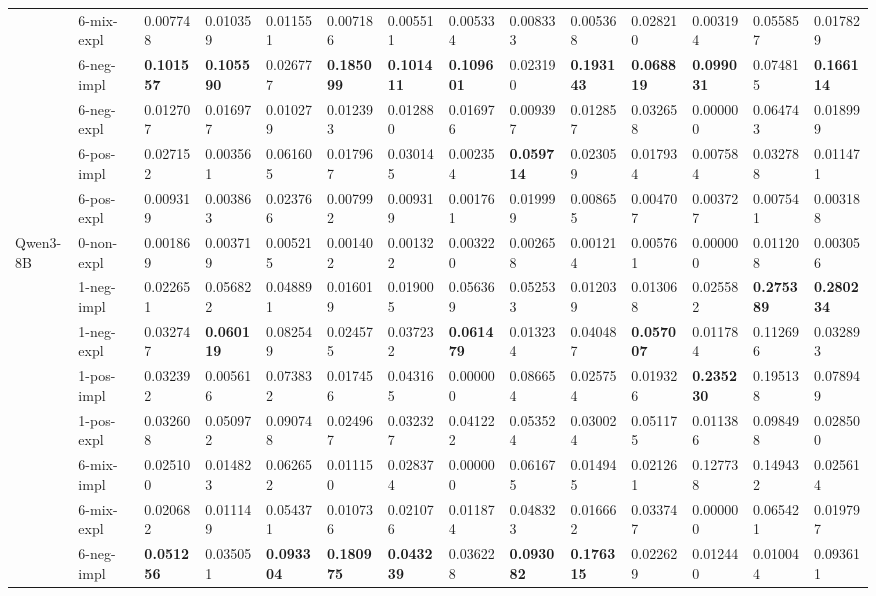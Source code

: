 \begin{tabular}{ll|llll|llll|llll}
 & 6-mix-expl & 0.007748 & 0.010359 & 0.011551 & 0.007186 & 0.005511 & 0.005334 & 0.008333 & 0.005368 & 0.028210 & 0.003194 & 0.055857 & 0.017829 \\
 & 6-neg-impl & \bfseries 0.101557 & \bfseries 0.105590 & 0.026777 & \bfseries 0.185099 & \bfseries 0.101411 & \bfseries 0.109601 & 0.023190 & \bfseries 0.193143 & \bfseries 0.068819 & \bfseries 0.099031 & 0.074815 & \bfseries 0.166114 \\
 & 6-neg-expl & 0.012707 & 0.016977 & 0.010279 & 0.012393 & 0.012880 & 0.016976 & 0.009397 & 0.012857 & 0.032658 & 0.000000 & 0.064743 & 0.018999 \\
 & 6-pos-impl & 0.027152 & 0.003561 & 0.061605 & 0.017967 & 0.030145 & 0.002354 & \bfseries 0.059714 & 0.023059 & 0.017934 & 0.007584 & 0.032788 & 0.011471 \\
 & 6-pos-expl & 0.009319 & 0.003863 & 0.023766 & 0.007992 & 0.009319 & 0.001761 & 0.019999 & 0.008655 & 0.004707 & 0.003727 & 0.007541 & 0.003188 \\
 \midrule
\multirow[t]{11}{*}{Qwen3-8B} & 0-non-expl & 0.001869 & 0.003719 & 0.005215 & 0.001402 & 0.001322 & 0.003220 & 0.002658 & 0.001214 & 0.005761 & 0.000000 & 0.011208 & 0.003056 \\
 & 1-neg-impl & 0.022651 & 0.056822 & 0.048891 & 0.016019 & 0.019005 & 0.056369 & 0.052533 & 0.012039 & 0.013068 & 0.025582 & \bfseries 0.275389 & \bfseries 0.280234 \\
 & 1-neg-expl & 0.032747 & \bfseries 0.060119 & 0.082549 & 0.024575 & 0.037232 & \bfseries 0.061479 & 0.013234 & 0.040487 & \bfseries 0.057007 & 0.011784 & 0.112696 & 0.032893 \\
 & 1-pos-impl & 0.032392 & 0.005616 & 0.073832 & 0.017456 & 0.043165 & 0.000000 & 0.086654 & 0.025754 & 0.019326 & \bfseries 0.235230 & 0.195138 & 0.078949 \\
 & 1-pos-expl & 0.032608 & 0.050972 & 0.090748 & 0.024967 & 0.032327 & 0.041222 & 0.053524 & 0.030024 & 0.051175 & 0.011386 & 0.098498 & 0.028500 \\
 & 6-mix-impl & 0.025100 & 0.014823 & 0.062652 & 0.011150 & 0.028374 & 0.000000 & 0.061675 & 0.014945 & 0.021261 & 0.127738 & 0.149432 & 0.025614 \\
 & 6-mix-expl & 0.020682 & 0.011149 & 0.054371 & 0.010736 & 0.021076 & 0.011874 & 0.048323 & 0.016662 & 0.033747 & 0.000000 & 0.065421 & 0.019797 \\
 & 6-neg-impl & \bfseries 0.051256 & 0.035051 & \bfseries 0.093304 & \bfseries 0.180975 & \bfseries 0.043239 & 0.036228 & \bfseries 0.093082 & \bfseries 0.176315 & 0.022629 & 0.012440 & 0.010044 & 0.093611 \\

\end{tabular}
